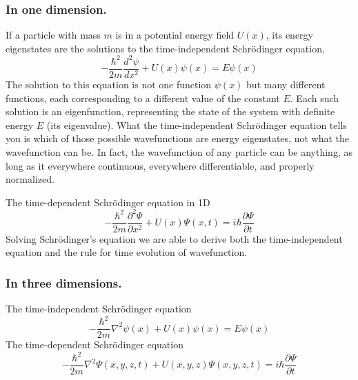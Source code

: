 \documentclass[../main.tex]{subfiles}
\begin{document}
\subsubsection*{In one dimension.} If a particle with mass $m$ is in a potential energy field $U(x)$, its energy eigenstates are the solutions to the time-independent Schrödinger equation,
\begin{equation*}
    -\frac{\hbar^2}{2m}\frac{d^2\psi}{dx^2}+U(x)\psi(x)=E\psi(x)
\end{equation*}
The solution to this equation is not one function $\psi(x)$ but many different functions, each corresponding to a different value of the constant $E$. Each such solution is an eigenfunction, representing the state of the system with definite energy $E$ (its eigenvalue). What the time-independent Schrödinger equation tells you is which of those possible wavefunctions are energy eigenstates, not what the wavefunction can be. In fact, the wavefunction of any particle can be anything, as long as it everywhere continuous, everywhere differentiable, and properly normalized.

The time-dependent Schrödinger equation in 1D
\begin{equation*}
    -\frac{\hbar^2}{2m}\frac{\partial^2{\Psi}}{\partial x^2}+U(x)\Psi(x,t)=i\hbar \frac{\partial {\Psi}}{\partial t}
\end{equation*}
Solving Schrödinger's equation we are able to derive both the time-independent equation and the rule for time evolution of wavefunction.

\subsubsection*{In three dimensions.}  The time-independent Schrödinger equation
\begin{equation*}
    -\frac{\hbar^2}{2m}\nabla^2\psi (x)+U(x)\psi(x)=E\psi(x)
\end{equation*}
The time-dependent Schrödinger equation
\begin{equation*}
    -\frac{\hbar^2}{2m}\nabla^2 {\Psi}(x,y,z,t) + U(x,y,z)  {\Psi}(x,y,z,t) = i\hbar \frac{\partial {\Psi}}{\partial t}
\end{equation*}
\end{document}
